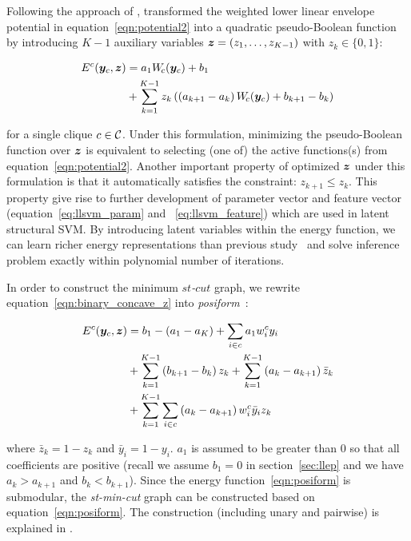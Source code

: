 Following the approach of ,
 transformed the weighted
lower linear envelope potential in equation~\eqref{eqn:potential2} into a
quadratic pseudo-Boolean function by introducing $K-1$ auxiliary
variables ${\bm{z}} = \left(z_1, \ldots, z_{K-1}\right)$ with $z_k\in
\{0,1\}$:

\begin{align}
  E^c({\bm{y}}_c, {\bm{z}}) &= a_1 W_{\!c}({\bm{y}}_c) + b_1 \notag \\
  &+ \sum_{k = 1}^{K-1} z_k \left( \left(a_{k+1} - a_k\right) W_{\!c}({\bm{y}}_c) + b_{k+1} - b_k \right)
  \label{eqn:binary_concave_z}
\end{align}

\noindent for a single clique $c \in \cal C$. Under this formulation,
minimizing the pseudo-Boolean function over ${\bm{z}}$ is equivalent
to selecting (one of) the active functions(s) from
equation~\eqref{eqn:potential2}. Another important property of
optimized ${\bm{z}}$ under this formulation is that it automatically
satisfies the constraint: $z_{k+1} \leq z_k$. This property give rise to further development of
parameter vector and feature
vector (equation~\eqref{eq:llsvm_param} and ~\eqref{eq:llsvm_feature})
which are used in latent
structural SVM. By introducing latent variables within the energy function, we
can learn richer energy representations than previous
study~\cite{gouldlearning} and solve inference problem exactly
within polynomial number of iterations.

In order to construct the minimum \emph{$st$-$cut$} graph, we rewrite
equation~\eqref{eqn:binary_concave_z} into
\emph{posiform}~\cite{Boros:MATH02}:

\begin{align}
  \label{eqn:posiform}  
  E^c({\bm{y}}_c, {\bm{z}})
  &= b_1 - (a_1 - a_K) + \sum_{i \in c} a_1 w^c_i y_i \notag\\
  & + \sum_{k = 1}^{K - 1} \left( b_{k+1} - b_k \right) z_k
    + \sum_{k = 1}^{K - 1} \left( a_k - a_{k+1} \right)
    \bar{z}_k\notag\\
  & + \sum_{k = 1}^{K - 1} \sum_{i \in c} \left( a_k - a_{k+1}
    \right) w^c_i \bar{y}_i z_k
\end{align}

\noindent where $\bar{z}_k = 1 - z_k$ and $\bar{y}_i = 1 - y_i$.
$a_1$ is assumed to be greater than $0$ so that all coefficients
are positive (recall we assume $b_1=0$ in section~\ref{sec:llep}
and we have $a_k > a_{k+1}$ and $b_k < b_{k+1}$). Since the energy function~\eqref{eqn:posiform}
is submodular, the \emph{st-min-cut} graph can be constructed 
based on equation~\eqref{eqn:posiform}. The construction (including 
unary and pairwise) is explained in . 

